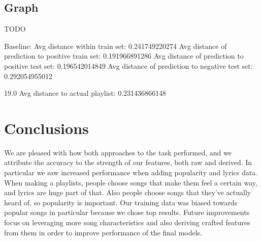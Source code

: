 \documentclass[acmtog]{acmart}
\begin{document}
\subsection{Graph}

TODO

Baseline: Avg distance within train set:          0.241749220274
Avg distance of prediction to positive train set: 0.191966891286
Avg distance of prediction to positive test set:  0.196542014849
Avg distance of prediction to negative test set:  0.292054955012

19.0
Avg distance to actual playlist: 0.231436866148

\section{Conclusions}

We are pleased with how both approaches to the task performed, and we attribute the accuracy to the strength of our features, both raw and derived. In particular we saw increased performance when adding popularity and lyrics data. When making a playlists, people choose songs that make them feel a certain way, and lyrics are huge part of that. Also people choose songs that they’ve actually heard of, so popularity is important. Our training data was biased towards popular songs in particular because we chose top results. Future improvements focus on leveraging more song characteristics and also deriving crafted features from them in order to improve performance of the final models. 


{}

%
\end{document}
